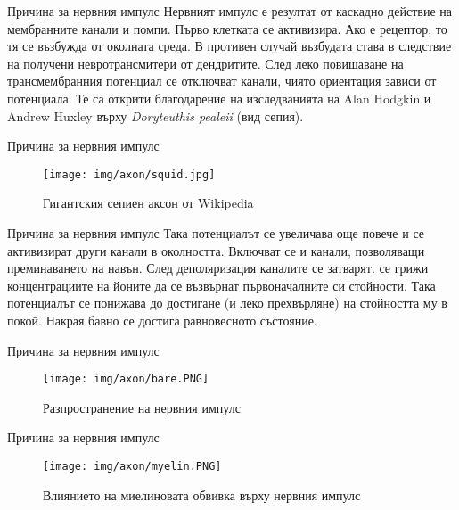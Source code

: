 \begin{frame}[t]{Причина за нервния импулс}
  Нервният импулс е резултат от каскадно действие на мембранните канали и помпи.
  Първо клетката се активизира.
  Ако е рецептор, то тя се възбужда от околната среда.
  В противен случай възбудата става в следствие на получени невротрансмитери от дендритите.
  След леко повишаване на трансмембранния потенциал се отключват  канали, чиято ориентация зависи от потенциала.
  Те са открити благодарение на изследванията на Alan Hodgkin и Andrew Huxley върху \textit{Doryteuthis pealeii} (вид сепия).
\end{frame}

\begin{frame}[t]{Причина за нервния импулс}
  \begin{figure}[htbp!]
    \centering
    \texttt{[image: img/axon/squid.jpg]}
    \caption{Гигантския сепиен аксон от Wikipedia}
  \end{figure}
\end{frame}

\begin{frame}[t]{Причина за нервния импулс}
  Така потенциалът се увеличава още повече и се активизират други канали в околността.
  Включват се и канали, позволяващи преминаването на  навън.
  След деполяризация каналите се затварят.
   се грижи концентрациите на йоните да се възвърнат първоначалните си стойности.
  Така потенциалът се понижава до достигане (и леко прехвърляне) на стойността му в покой.
  Накрая бавно се достига равновесното състояние.
\end{frame}

\begin{frame}[t]{Причина за нервния импулс}
  \begin{figure}[htbp!]
    \centering
    \texttt{[image: img/axon/bare.PNG]}
    \caption{Разпространение на нервния импулс \cite[Фиг 3.12]{Neuroscience}}
  \end{figure}
\end{frame}

\begin{frame}[t]{Причина за нервния импулс}
  \begin{figure}[htbp!]
    \centering
    \texttt{[image: img/axon/myelin.PNG]}
    \caption{Влиянието на миелиновата обвивка върху нервния импулс \cite[Фиг 3.13]{Neuroscience}}
  \end{figure}
\end{frame}


